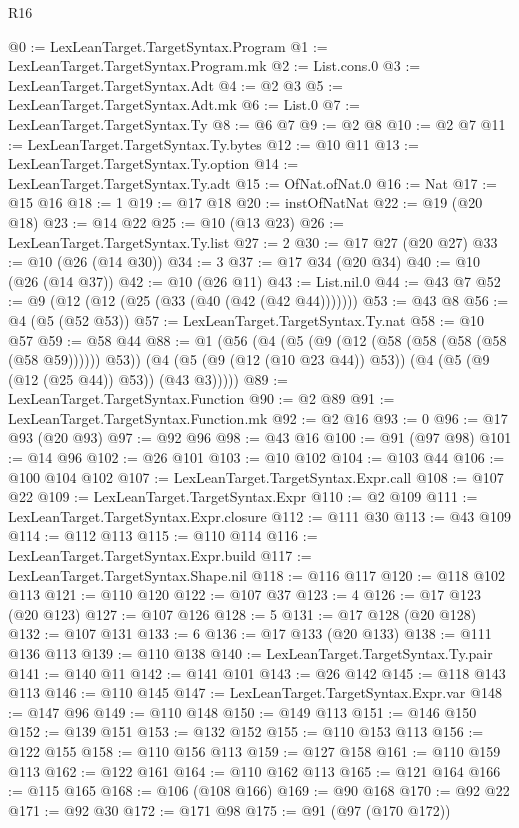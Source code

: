 \begin{lexlean}{R16}
\begin{coremodule}
@0 := LexLeanTarget.TargetSyntax.Program
@1 := LexLeanTarget.TargetSyntax.Program.mk
@2 := List.cons.{0}
@3 := LexLeanTarget.TargetSyntax.Adt
@4 := @2 @3
@5 := LexLeanTarget.TargetSyntax.Adt.mk
@6 := List.{0}
@7 := LexLeanTarget.TargetSyntax.Ty
@8 := @6 @7
@9 := @2 @8
@10 := @2 @7
@11 := LexLeanTarget.TargetSyntax.Ty.bytes
@12 := @10 @11
@13 := LexLeanTarget.TargetSyntax.Ty.option
@14 := LexLeanTarget.TargetSyntax.Ty.adt
@15 := OfNat.ofNat.{0}
@16 := Nat
@17 := @15 @16
@18 := 1
@19 := @17 @18
@20 := instOfNatNat
@22 := @19 (@20 @18)
@23 := @14 @22
@25 := @10 (@13 @23)
@26 := LexLeanTarget.TargetSyntax.Ty.list
@27 := 2
@30 := @17 @27 (@20 @27)
@33 := @10 (@26 (@14 @30))
@34 := 3
@37 := @17 @34 (@20 @34)
@40 := @10 (@26 (@14 @37))
@42 := @10 (@26 @11)
@43 := List.nil.{0}
@44 := @43 @7
@52 := @9 (@12 (@12 (@25 (@33 (@40 (@42 (@42 @44)))))))
@53 := @43 @8
@56 := @4 (@5 (@52 @53))
@57 := LexLeanTarget.TargetSyntax.Ty.nat
@58 := @10 @57
@59 := @58 @44
@88 := @1
    (@56
      (@4
        (@5 (@9 (@12 (@58 (@58 (@58 (@58 (@58 @59)))))) @53))
        (@4 (@5 (@9 (@12 (@10 @23 @44)) @53)) (@4 (@5 (@9 (@12 (@25 @44)) @53)) (@43 @3)))))
@89 := LexLeanTarget.TargetSyntax.Function
@90 := @2 @89
@91 := LexLeanTarget.TargetSyntax.Function.mk
@92 := @2 @16
@93 := 0
@96 := @17 @93 (@20 @93)
@97 := @92 @96
@98 := @43 @16
@100 := @91 (@97 @98)
@101 := @14 @96
@102 := @26 @101
@103 := @10 @102
@104 := @103 @44
@106 := @100 @104 @102
@107 := LexLeanTarget.TargetSyntax.Expr.call
@108 := @107 @22
@109 := LexLeanTarget.TargetSyntax.Expr
@110 := @2 @109
@111 := LexLeanTarget.TargetSyntax.Expr.closure
@112 := @111 @30
@113 := @43 @109
@114 := @112 @113
@115 := @110 @114
@116 := LexLeanTarget.TargetSyntax.Expr.build
@117 := LexLeanTarget.TargetSyntax.Shape.nil
@118 := @116 @117
@120 := @118 @102 @113
@121 := @110 @120
@122 := @107 @37
@123 := 4
@126 := @17 @123 (@20 @123)
@127 := @107 @126
@128 := 5
@131 := @17 @128 (@20 @128)
@132 := @107 @131
@133 := 6
@136 := @17 @133 (@20 @133)
@138 := @111 @136 @113
@139 := @110 @138
@140 := LexLeanTarget.TargetSyntax.Ty.pair
@141 := @140 @11
@142 := @141 @101
@143 := @26 @142
@145 := @118 @143 @113
@146 := @110 @145
@147 := LexLeanTarget.TargetSyntax.Expr.var
@148 := @147 @96
@149 := @110 @148
@150 := @149 @113
@151 := @146 @150
@152 := @139 @151
@153 := @132 @152
@155 := @110 @153 @113
@156 := @122 @155
@158 := @110 @156 @113
@159 := @127 @158
@161 := @110 @159 @113
@162 := @122 @161
@164 := @110 @162 @113
@165 := @121 @164
@166 := @115 @165
@168 := @106 (@108 @166)
@169 := @90 @168
@170 := @92 @22
@171 := @92 @30
@172 := @171 @98
@175 := @91 (@97 (@170 @172))

\end{coremodule}
\end{lexlean}
